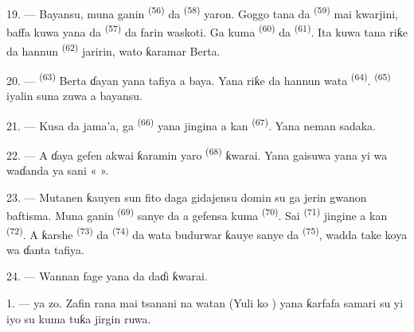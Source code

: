 19. --- Bayansu, muna ganin  \textsuperscript{(56)} da
 \textsuperscript{(58)} yaron. Goggo tana da
 \textsuperscript{(59)} mai kwarjini, baffa kuwa yana da
 \textsuperscript{(57)} da farin waskoti. Ga
kuma  \textsuperscript{(60)} da 
\textsuperscript{(61)}. Ita kuwa tana riƙe da hannun 
\textsuperscript{(62)} jaririn, wato ƙaramar Berta.

20. ---  \textsuperscript{(63)} Berta ɗayan yana
tafiya a baya. Yana riƙe da hannun wata 
\textsuperscript{(64)}.  \textsuperscript{(65)} iyalin
suna zuwa a bayansu.

\VUsaut{4.6mm}
\VUsaut{3.4mm}

21. --- Kusa da jama’a, ga  \textsuperscript{(66)} yana
jingina a kan  \textsuperscript{(67)}. Yana
neman sadaka.

22. --- A ɗaya gefen akwai ƙaramin yaro 
\textsuperscript{(68)} ƙwarai. Yana gaisuwa yana yi wa waɗanda ya sani
«  ».

23. --- Mutanen ƙauyen sun fito daga gidajensu domin su ga jerin
gwanon baftisma. Muna ganin  \textsuperscript{(69)}
sanye da  a gefensa kuma 
\textsuperscript{(70)}. Sai  \textsuperscript{(71)}
jingine a kan  \textsuperscript{(72)}. A ƙarshe
 \textsuperscript{(73)} da  \textsuperscript{(74)} da wata budurwar ƙauye sanye da
 \textsuperscript{(75)}, wadda take koya wa
ɗanta tafiya.

24. --- Wannan fage yana da daɗi ƙwarai.

\VUsaut{4.0mm}
\VUsaut{3.0mm}

\VUsaut{2.4mm}

\VUsaut{3.0mm}

1. ---  ya zo. Zafin rana mai tsanani na watan
 (Yuli ko ) yana ƙarfafa samari su yi iyo
su kuma tuƙa jirgin ruwa.

